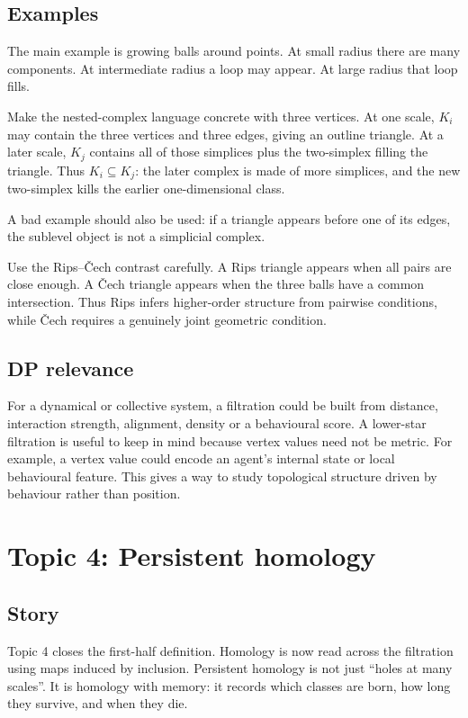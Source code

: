 \documentclass[11pt,a4paper]{article}
\newcommand{\weekheading}[2]{%
\section*{Topic #1: #2}
\addcontentsline{toc}{section}{Topic #1: #2}
}
\newcommand{\planningbox}[2]{%
\subsection*{#1}
#2
}
\begin{document}
\planningbox{Examples}{
The main example is growing balls around points. At small radius there are many
components. At intermediate radius a loop may appear. At large radius that loop
fills.

Make the nested-complex language concrete with three vertices. At one scale,
\(K_i\) may contain the three vertices and three edges, giving an outline
triangle. At a later scale, \(K_j\) contains all of those simplices plus the
two-simplex filling the triangle. Thus \(K_i\subseteq K_j\): the later complex
is made of more simplices, and the new two-simplex kills the earlier
one-dimensional class.

A bad example should also be used: if a triangle appears before one of its
edges, the sublevel object is not a simplicial complex.

Use the Rips--\v{C}ech contrast carefully. A Rips triangle appears when all
pairs are close enough. A \v{C}ech triangle appears when the three balls have a
common intersection. Thus Rips infers higher-order structure from pairwise
conditions, while \v{C}ech requires a genuinely joint geometric condition.
}

\planningbox{DP relevance}{
For a dynamical or collective system, a filtration could be built from distance,
interaction strength, alignment, density or a behavioural score. A lower-star
filtration is useful to keep in mind because vertex values need not be metric.
For example, a vertex value could encode an agent's internal state or local
behavioural feature. This gives a way to study topological structure driven by
behaviour rather than position.
}

\weekheading{4}{Persistent homology}

\planningbox{Story}{
Topic 4 closes the first-half definition. Homology is now read across the
filtration using maps induced by inclusion. Persistent homology is not just
``holes at many scales''. It is homology with memory: it records which classes
are born, how long they survive, and when they die.
}
\end{document}
